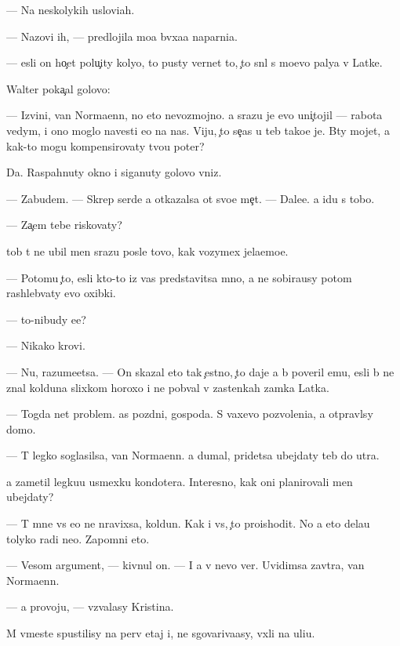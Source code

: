 \documentclass[10pt]{book}
\begin{document}
— Na neskolykih uslovi{\y}ah.

— Nazovi ih, — predlojila mo{\y}a b{\yi}vxa{\y}a naparni{\q}a.

— {\Y}esli on ho{\c}et polu{\c}ity koly{\q}o, to pusty vernet to, {\c}to sn{\ia}l s mo{\y}evo paly{\q}a v Latke.

Walter poka{\c}al golovo{\y}:

— Izvini, van Normaenn, no eto nevozmojno. {\Y}a srazu je {\y}evo uni{\c}tojil — rabota vedym{\yi}, i ono moglo navesti {\y}e{\y}o na nas. Viju, {\c}to se{\y}{\c}as u teb{\ia} tako{\y}e je. B{\yi}ty mojet, {\y}a kak-to mogu kompensirovaty tvo{\y}u poter{\iu}?

Da. Raspahnuty okno i siganuty golovo{\y} vniz.

— Zabudem. — Skrep{\ia} serd{\q}e {\y}a otkazalsa ot svo{\y}e{\y} me{\c}t{\yi}. — Dale{\y}e. {\Y}a idu s tobo{\y}.

— Za{\c}em tebe riskovaty?

{\C}tob{\yi} t{\yi} ne ubil men{\ia} srazu posle tovo, kak vozymex jela{\y}emo{\y}e.

— Potomu {\c}to, {\y}esli kto-to iz vas predstavitsa mno{\y}, {\y}a ne sobira{\y}usy potom rashleb{\yi}vaty {\y}evo oxibki.

— {\C}to-nibudy {\y}e{\x}e?

— Nikako{\y} krovi.

— Nu, razume{\y}etsa. — On skazal eto tak {\c}estno, {\c}to daje {\y}a b{\yi} poveril {\y}emu, {\y}esli b{\yi} ne znal kolduna slixkom horoxo i ne pob{\yi}val v zastenkah zamka Latka.

— Togda net problem. {\C}as pozdni{\y}, gospoda. S vaxevo pozvoleni{\y}a, {\y}a otpravl{\iu}sy domo{\y}.

— T{\yi} legko soglasilsa, van Normaenn. {\Y}a dumal, pridetsa ubejdaty teb{\ia} do utra.

{\Y}a zametil legku{\y}u usmexku kondot{\y}era. Interesno, kak oni planirovali men{\ia} ubejdaty?

— T{\yi} mne vs{\e} {\y}e{\x}o ne nravixsa, koldun. Kak i vs{\e}, {\c}to proishodit. No {\y}a eto dela{\y}u tolyko radi ne{\y}o. Zapomni eto.

— Vesom{\yi}{\y} argument, — kivnul on. — I {\y}a v nevo ver{\iu}. Uvidimsa zavtra, van Normaenn.

— {\Y}a provoju, — v{\yi}zvalasy Kristina.

M{\yi} vmeste spustilisy na perv{\yi}{\y} etaj i, ne sgovariva{\y}asy, v{\yi}xli na uli{\q}u.
\end{document}
